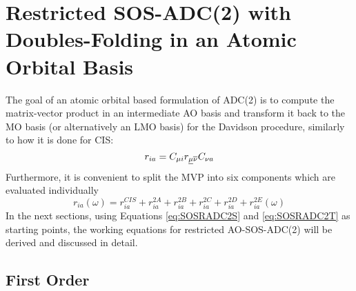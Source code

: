 \section[Working Equations For Restricted AO-SOS-ADC(2)]{Restricted SOS-ADC(2) with Doubles-Folding in an Atomic Orbital Basis}

The goal of an atomic orbital based formulation of ADC(2) is to compute the matrix-vector product in an intermediate AO basis and transform it back to the MO basis (or alternatively an LMO basis) for the Davidson procedure, similarly to how it is done for CIS:
\begin{equation}
r_{ia} = C_{\mu i} r_{\underline{\mu} \overline{\nu}} C_{\nu a}
\end{equation}
\noindent Furthermore, it is convenient to split the MVP into six components which are evaluated individually
\begin{equation}
r_{ia}(\omega) = r_{ia}^{CIS} + r_{ia}^{2A} + r_{ia}^{2B} + r_{ia}^{2C} + r_{ia}^{2D} + r_{ia}^{2E}(\omega)
\end{equation}
\noindent In the next sections, using Equations \ref{eq:SOSRADC2S} and \ref{eq:SOSRADC2T} as starting points, the working equations for restricted AO-SOS-ADC(2) will be derived and discussed in detail. 

\subsection{First Order}

